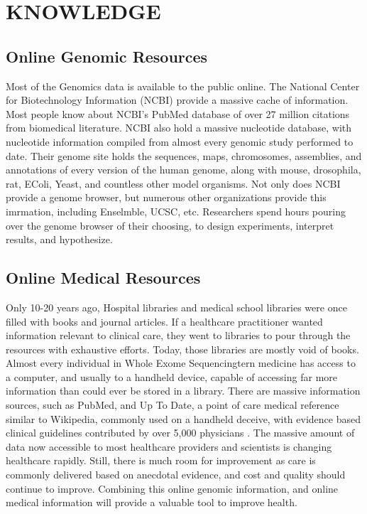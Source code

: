 \documentclass[sigconf]{acmart}
\begin{document}
\section{KNOWLEDGE}

\subsection{Online Genomic Resources}
Most of the Genomics data is available to the public online. The National Center for Biotechnology Information (NCBI)  provide a massive cache of information.  Most people know about NCBI's PubMed database of over 27 million citations from biomedical literature.  NCBI also hold  a massive nucleotide database, with nucleotide information compiled from almost every genomic study performed to date.  Their genome site holds the sequences, maps, chromosomes, assemblies, and annotations of every version of the human genome, along with mouse, drosophila, rat, EColi, Yeast, and countless other model organisms.   Not only does NCBI provide a genome browser, but numerous other organizations provide this imrmation, including Enselmble, UCSC, etc.  Researchers spend hours pouring over the genome browser of their choosing,  to design experiments, interpret results, and hypothesize.    

\subsection{Online Medical Resources}
Only 10-20 years ago, Hospital libraries and medical school libraries
were once filled with books and journal articles.  If a healthcare
practitioner wanted information relevant to clinical care, they went
to libraries to pour through the resources with exhaustive efforts.
Today, those libraries are mostly void of books.  Almost every
individual in Whole Exome Sequencingtern medicine has access to a computer, and usually
to a handheld device, capable of accessing far more information than
could ever be stored in a library.  There are massive information
sources, such as PubMed, and Up
To Date, a point of care medical reference similar to Wikipedia, commonly used on a handheld
deceive, with evidence based clinical guidelines contributed by over
5,000 physicians \cite{wiki-uptodate}. The massive amount of data now
accessible to most healthcare providers and scientists is changing
healthcare rapidly.  Still, there is much room for improvement as care
is commonly delivered based on anecdotal evidence, and cost and
quality should continue to improve.  Combining this online genomic information, and online medical information will provide a valuable tool to improve health.  
\end{document}
